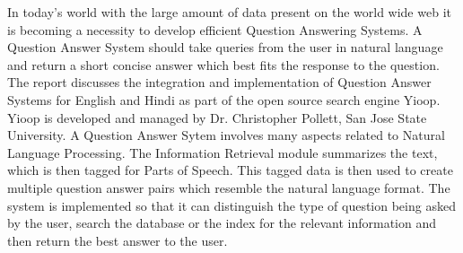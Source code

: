 In today's world with the large amount of data present on the world wide web it is becoming a necessity to develop efficient Question Answering Systems. A Question Answer System should take queries from the user in natural language and return a short concise answer which best fits the response to the question. The report discusses the integration and implementation of Question Answer Systems for English and Hindi as part of the  open source search engine Yioop. Yioop is developed and managed by Dr. Christopher Pollett, San Jose State University.  A Question  Answer Sytem involves  many aspects related to Natural Language Processing.  The Information Retrieval module summarizes the text, which is then tagged for Parts of Speech. This tagged data is then used to create multiple question answer pairs which resemble the natural language format. The system is implemented so that it can distinguish the type of question being asked by the user, search the database or the index for the relevant information and then return the best answer to the user.

